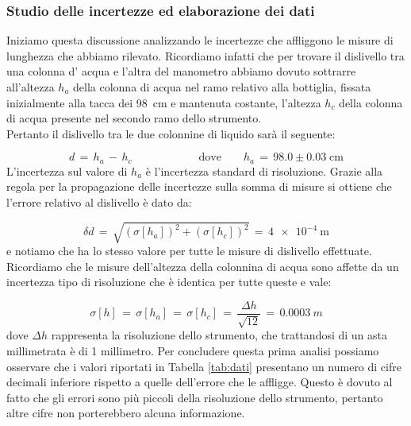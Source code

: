 \subsubsection{Studio delle incertezze ed elaborazione dei dati}

\begin{table}
\end{table}

Iniziamo questa discussione analizzando le incertezze che affliggono le misure di lunghezza che abbiamo rilevato. Ricordiamo infatti che per trovare il dislivello tra una colonna d' acqua e l'altra del manometro abbiamo dovuto sottrarre all'altezza $h_a$ della colonna di acqua nel ramo relativo alla bottiglia, fissata inizialmente alla tacca dei \SI{98}{\centi\metre} e mantenuta costante, l'altezza $h_c$ della colonna di acqua presente nel secondo ramo dello strumento.\\
Pertanto il dislivello tra le due colonnine di liquido sarà il seguente:

\begin{equation*}
    d \,=\, h_a \,-\, h_c \qquad \qquad \qquad \text{dove} \qquad h_a \,=\, 98.0 \pm 0.03 \; \si{\centi\metre} 
\end{equation*}
%
L'incertezza sul valore di $h_a$ è l'incertezza standard di risoluzione.
Grazie alla regola per la propagazione delle incertezze sulla somma di misure si ottiene che l'errore relativo al dislivello è dato da:

\begin{equation*}
    \delta d \,=\, \sqrt{(\sigma [h_a])^2+(\sigma [h_c])^2} \,=\, \SI{4e-4}{\metre}
\end{equation*}
%
e notiamo che ha lo stesso valore per tutte le misure di dislivello effettuate. Ricordiamo che le misure dell'altezza della colonnina di acqua sono affette da un incertezza tipo di risoluzione che è identica per tutte queste e vale:

\begin{equation*}
	\sigma [h] \,=\, \sigma [h_a] \,=\, \sigma [h_c] \,=\, \frac{\Delta h}{\sqrt{12}} \,=\, \SI{0.0003}{m} 
\end{equation*}
%
dove $\Delta h$ rappresenta la risoluzione dello strumento, che trattandosi di un asta millimetrata è di 1 millimetro. Per concludere questa prima analisi possiamo osservare che i valori riportati in Tabella \ref{tab:dati} presentano un numero di cifre decimali inferiore rispetto a quelle dell'errore che le affligge. Questo è dovuto al fatto che gli errori sono più piccoli della risoluzione dello strumento, pertanto altre cifre non porterebbero alcuna informazione.

